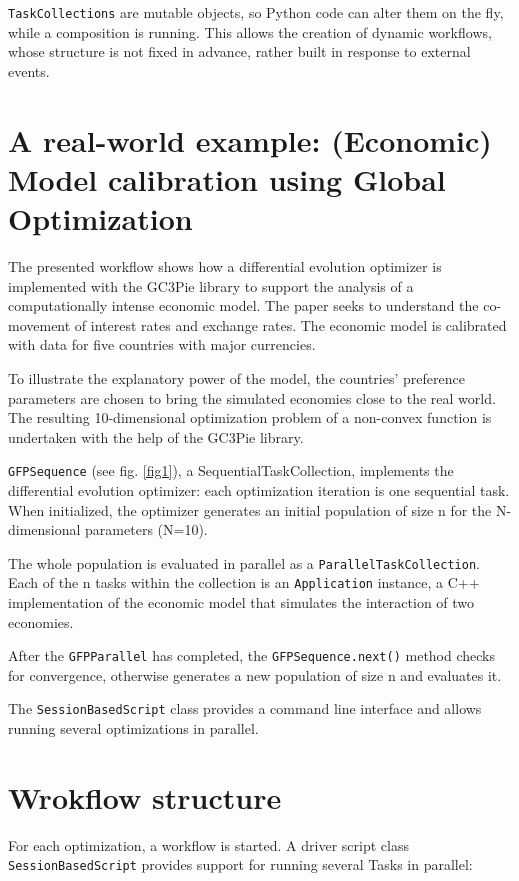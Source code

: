 \documentclass{PoS}
\begin{document}
\texttt{TaskCollections} are mutable objects, so Python code can alter them on
the fly, while a composition is running. This allows the creation of
dynamic workflows, whose structure is not fixed in advance, rather
built in response to external events.

\section{A real-world example: (Economic) Model calibration using
  Global Optimization}

The presented workflow shows how a differential evolution optimizer is
implemented with the GC3Pie library to support the analysis of a
computationally intense economic model. The paper \cite{Jones2011}
seeks to understand the co-movement of interest rates and exchange
rates. The economic model is calibrated with data for five countries
with major currencies.
 
To illustrate the explanatory power of the model, the countries'
preference parameters are chosen to bring the simulated economies
close to the real world. The resulting 10-dimensional optimization
problem of a non-convex function is undertaken with the help of the
GC3Pie library. 

\texttt{GFPSequence} (see fig. \ref{fig1}), a
SequentialTaskCollection, implements the differential evolution
optimizer: each optimization iteration is one sequential task. When
initialized, the optimizer generates an initial population of size n
for the N-dimensional parameters (N=10).  

The whole population is evaluated in parallel as a
\texttt{ParallelTaskCollection}. Each of the n tasks within
the collection is an \texttt{Application} instance, a C++
implementation of the economic model that simulates the interaction of
two economies. 
 
After the \texttt{GFPParallel} has completed, the
\texttt{GFPSequence.next()} method checks for convergence, otherwise
generates  a new population of size n and evaluates it.


The \texttt{SessionBasedScript} class provides a command line interface and
allows running several optimizations in parallel.

\section{Wrokflow structure}
For each optimization, a workflow is started. A driver script class
\texttt{SessionBasedScript} provides support for running several Tasks
in parallel:
\end{document}
